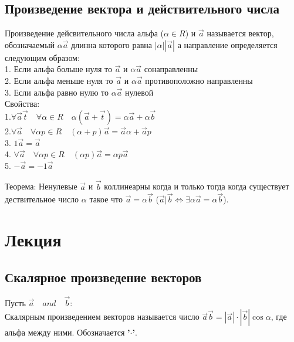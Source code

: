 \documentclass[a4paper, 12pt]{article}
\begin{document}
\subsection{Произведение вектора и действительного числа}
Произведение дейсвительного числа альфа ($ \alpha \in R $) и $ \vec{a} $ называется вектор, обозначаемый $ \alpha\vec{a} $ длинна которого равна $ |\alpha||\vec{a}| $ а направление определяется следующим образом:\\
1. Если альфа больше нуля то $ \vec{a} $ и $ \alpha\vec{a} $ сонаправленны\\
2. Если альфа меньше нуля то $ \vec{a} $ и $ \alpha\vec{a} $ противоположно направленны\\
3. Если альфа равно нулю то  $ \alpha\vec{a} $ нулевой\\
Свойства:\\
1.$\forall \vec{a}\vec{t} \quad\forall \alpha \in R \quad\alpha(\vec{a}+ \vec{t}) = \alpha \vec{a} + \alpha \vec{b}$\\
2.$  \forall \vec{a} \quad\forall \alpha p\in R  \quad(\alpha + p)\vec{a} = \vec{a} \alpha + \vec{a}p$\\
3. $  1 \vec{a} = \vec{a} $\\
4. $  \forall \vec{a} \quad\forall \alpha p \in R  \quad(\alpha p)\vec{a}= \alpha p\vec{a}$\\
5. $  -\vec{a} = -1\vec{a} $\\
\begin{mdframed}[backgroundcolor=blue!20] 
       Теорема: Ненулевые $ \vec{a} $ и $ \vec{b} $ коллинеарны когда и только тогда когда существует дествительное число $ \alpha $ такое что $ \vec{a} = \alpha\vec{b} $ ($\vec{a}|\vec{b} \Leftrightarrow \exists \alpha \vec{a} = \alpha\vec{b}$).
    \end{mdframed}

\section{Лекция}

\subsection{Скалярное произведение векторов}
Пусть $ \vec{a} \quad and \quad \vec{b} $:\\
Скалярным произведением векторов называется число $ \vec{a} \vec{b} = |\vec{a}|\cdot |\vec{b}|\cos \alpha $, где альфа между ними. Обозначается \textbf{'$ \cdot $'}.
\end{document}
